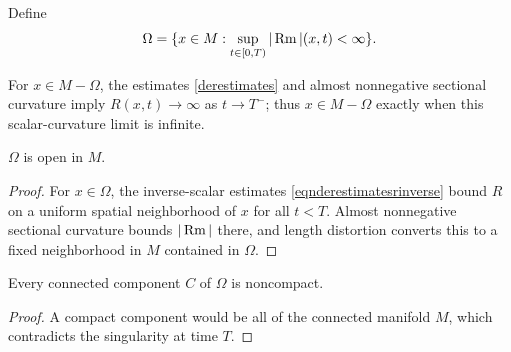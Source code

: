 \begin{definition}
  \label{def:kl-structure-at-first-singularity-time-bounded-curvature-regular-set}

Define
\begin{equation}
\Omega=\{x\in M:\sup_{t\in[0,T)}|\operatorname{Rm}|(x,t)<\infty\}.
\end{equation}
\end{definition}

For $x\in M-\Omega$, the estimates \eqref{derestimates} and almost
nonnegative sectional curvature imply $R(x,t)\to\infty$ as $t\to T^-$;
thus $x\in M-\Omega$ exactly when this scalar-curvature limit is infinite.

\begin{lemma}
  \label{lem:kl-structure-at-first-singularity-time-structure-at-first-singularity-time-lemma}
 \label{omegaopen}
$\Omega$ is open in $M$.
\end{lemma}
\begin{proof}
\sketch For $x\in\Omega$, the inverse-scalar estimates
\eqref{eqnderestimatesrinverse} bound $R$ on a uniform spatial neighborhood of
$x$ for all $t<T$. Almost nonnegative sectional curvature bounds $|\operatorname{Rm}|$ there,
and length distortion converts this to a fixed neighborhood in $M$ contained
in $\Omega$.
\end{proof}

\begin{lemma}
  \label{lem:kl-structure-at-first-singularity-time-compactness-structure-at-first-singularity-time}
 \label{omeganoncompact}
Every connected component $C$ of $\Omega$ is noncompact.
\end{lemma}
\begin{proof}
\sketch A compact component would be all of the connected manifold $M$, which
contradicts the singularity at time $T$.
\end{proof}

